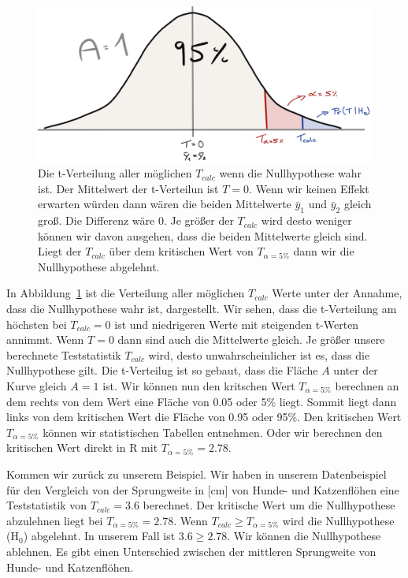 \documentclass[
  letterpaper,
]{scrbook}
\begin{document}
\begin{figure}

{\centering \includegraphics{./images/t-verteilung_01.png}

}

\caption{\label{fig-teststatistik-01}Die t-Verteilung aller möglichen
\(T_{calc}\) wenn die Nullhypothese wahr ist. Der Mittelwert der
t-Verteilun ist \(T=0\). Wenn wir keinen Effekt erwarten würden dann
wären die beiden Mittelwerte \(\bar{y}_1\) und \(\bar{y}_2\) gleich
groß. Die Differenz wäre 0. Je größer der \(T_{calc}\) wird desto
weniger können wir davon ausgehen, dass die beiden Mittelwerte gleich
sind. Liegt der \(T_{calc}\) über dem kritischen Wert von
\(T_{\alpha = 5\%}\) dann wir die Nullhypothese abgelehnt.}

\end{figure}

In Abbildung~\ref{fig-teststatistik-01} ist die Verteilung aller
möglichen \(T_{calc}\) Werte unter der Annahme, dass die Nullhypothese
wahr ist, dargestellt. Wir sehen, dass die t-Verteilung am höchsten bei
\(T_{calc} = 0\) ist und niedrigeren Werte mit steigenden t-Werten
annimmt. Wenn \(T = 0\) dann sind auch die Mittelwerte gleich. Je größer
unsere berechnete Teststatistik \(T_{calc}\) wird, desto
unwahrscheinlicher ist es, dass die Nullhypothese gilt. Die t-Verteilug
ist so gebaut, dass die Fläche \(A\) unter der Kurve gleich \(A=1\) ist.
Wir können nun den kritschen Wert \(T_{\alpha = 5\%}\) berechnen an dem
rechts von dem Wert eine Fläche von 0.05 oder 5\% liegt. Sommit liegt
dann links von dem kritischen Wert die Fläche von 0.95 oder 95\%. Den
kritischen Wert \(T_{\alpha = 5\%}\) können wir statistischen Tabellen
entnehmen. Oder wir berechnen den kritischen Wert direkt in R mit
\(T_{\alpha = 5\%} = 2.78\).

Kommen wir zurück zu unserem Beispiel. Wir haben in unserem
Datenbeispiel für den Vergleich von der Sprungweite in {[}cm{]} von
Hunde- und Katzenflöhen eine Teststatistik von \(T_{calc} = 3.6\)
berechnet. Der kritische Wert um die Nullhypothese abzulehnen liegt bei
\(T_{\alpha = 5\%} = 2.78\). Wenn \(T_{calc} \geq T_{\alpha = 5\%}\)
wird die Nullhypothese (H\(_0\)) abgelehnt. In unserem Fall ist
\(3.6 \geq 2.78\). Wir können die Nullhypothese ablehnen. Es gibt einen
Unterschied zwischen der mittleren Sprungweite von Hunde- und
Katzenflöhen.
\end{document}
